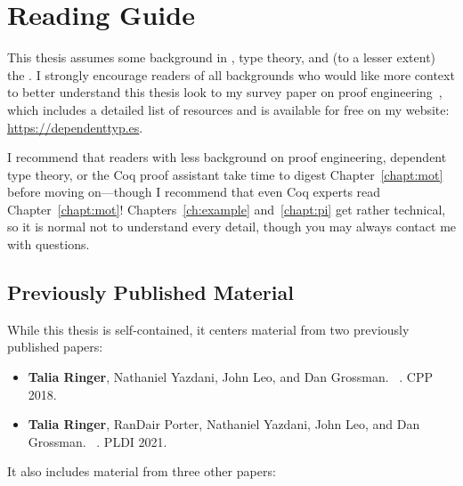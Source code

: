 \section{Reading Guide}
\label{sec:guide}


This thesis assumes some background in , type theory, and (to a lesser extent) the  . 
I strongly encourage readers of all backgrounds who would like more context to better understand this thesis
look to my survey paper on proof engineering~\cite{PGL-045}, which includes a detailed list of resources
and is available for free on my website: \url{https://dependenttyp.es}.

I recommend that readers with less background on proof engineering, dependent type theory, or the Coq proof assistant
take time to digest Chapter~\ref{chapt:mot} before moving on---though I recommend that even Coq experts read Chapter~\ref{chapt:mot}!
Chapters~\ref{ch:example} and~\ref{chapt:pi} get rather technical, so it is normal not to understand every detail,
though you may always contact me with questions.

\subsection*{Previously Published Material}

While this thesis is self-contained, it centers material from two previously published papers:

\begin{itemize}
\item \textbf{Talia Ringer}, Nathaniel Yazdani, John Leo, and Dan Grossman. ~\cite{ringer2018adapting}. CPP 2018.
\item \textbf{Talia Ringer}, RanDair Porter, Nathaniel Yazdani, John Leo, and Dan Grossman. ~\cite{Ringer2021}. PLDI 2021.
\end{itemize}
It also includes material from three other papers:

